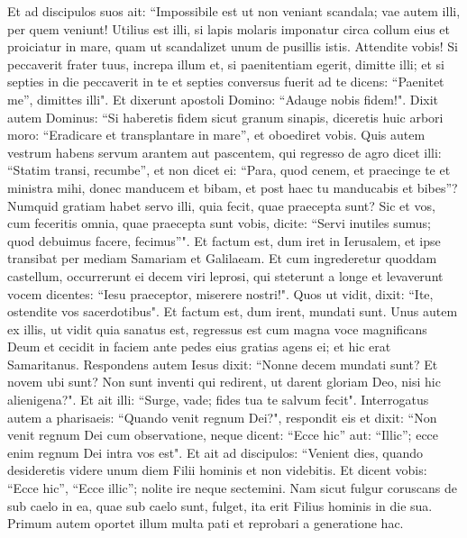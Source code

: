 \begin{biblechapter}  
\verse Et ad discipulos suos ait: “Impossibile est ut non veniant scandala; vae autem illi, per quem veniunt! 
\verse Utilius est illi, si lapis molaris imponatur circa collum eius et proiciatur in mare, quam ut scandalizet unum de pusillis istis. 
\verse Attendite vobis! Si peccaverit frater tuus, increpa illum et, si paenitentiam egerit, dimitte illi; 
\verse et si septies in die peccaverit in te et septies conversus fuerit ad te dicens: “Paenitet me”, dimittes illi". 
\verse Et dixerunt apostoli Domino: “Adauge nobis fidem!". 
\verse Dixit autem Dominus: “Si haberetis fidem sicut granum sinapis, diceretis huic arbori moro: “Eradicare et transplantare in mare”, et oboediret vobis. 
\verse Quis autem vestrum habens servum arantem aut pascentem, qui regresso de agro dicet illi: “Statim transi, recumbe”, 
\verse et non dicet ei: “Para, quod cenem, et praecinge te et ministra mihi, donec manducem et bibam, et post haec tu manducabis et bibes”? 
\verse Numquid gratiam habet servo illi, quia fecit, quae praecepta sunt?  
\verse Sic et vos, cum feceritis omnia, quae praecepta sunt vobis, dicite: “Servi inutiles sumus; quod debuimus facere, fecimus”". 
\verse Et factum est, dum iret in Ierusalem, et ipse transibat per mediam Samariam et Galilaeam. 
\verse Et cum ingrederetur quoddam castellum, occurrerunt ei decem viri leprosi, qui steterunt a longe 
\verse et levaverunt vocem dicentes: “Iesu praeceptor, miserere nostri!". 
\verse Quos ut vidit, dixit: “Ite, ostendite vos sacerdotibus". Et factum est, dum irent, mundati sunt. 
\verse Unus autem ex illis, ut vidit quia sanatus est, regressus est cum magna voce magnificans Deum 
\verse et cecidit in faciem ante pedes eius gratias agens ei; et hic erat Samaritanus. 
\verse Respondens autem Iesus dixit: “Nonne decem mundati sunt? Et novem ubi sunt? 
\verse Non sunt inventi qui redirent, ut darent gloriam Deo, nisi hic alienigena?". 
\verse Et ait illi: “Surge, vade; fides tua te salvum fecit". 
\verse Interrogatus autem a pharisaeis: “Quando venit regnum Dei?", respondit eis et dixit: “Non venit regnum Dei cum observatione, 
\verse neque dicent: “Ecce hic” aut: “Illic”; ecce enim regnum Dei intra vos est". 
\verse Et ait ad discipulos: “Venient dies, quando desideretis videre unum diem Filii hominis et non videbitis. 
\verse Et dicent vobis: “Ecce hic”, “Ecce illic”; nolite ire neque sectemini. 
\verse Nam sicut fulgur coruscans de sub caelo in ea, quae sub caelo sunt, fulget, ita erit Filius hominis in die sua. 
\verse Primum autem oportet illum multa pati et reprobari a generatione hac. 

\end{biblechapter}
